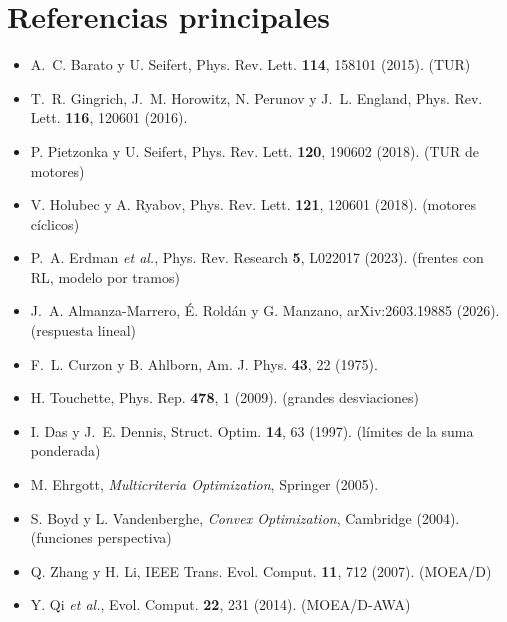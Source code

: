 \section*{Referencias principales}
\begin{itemize}\small
\item A.~C. Barato y U. Seifert, Phys. Rev. Lett. \textbf{114}, 158101 (2015). (TUR)
\item T.~R. Gingrich, J.~M. Horowitz, N. Perunov y J.~L. England, Phys. Rev. Lett. \textbf{116}, 120601 (2016).
\item P. Pietzonka y U. Seifert, Phys. Rev. Lett. \textbf{120}, 190602 (2018). (TUR de motores)
\item V. Holubec y A. Ryabov, Phys. Rev. Lett. \textbf{121}, 120601 (2018). (motores cíclicos)
\item P.~A. Erdman \emph{et al.}, Phys. Rev. Research \textbf{5}, L022017 (2023). (frentes con RL, modelo por tramos)
\item J.~A. Almanza-Marrero, É. Roldán y G. Manzano, arXiv:2603.19885 (2026). (respuesta lineal)
\item F.~L. Curzon y B. Ahlborn, Am. J. Phys. \textbf{43}, 22 (1975).
\item H. Touchette, Phys. Rep. \textbf{478}, 1 (2009). (grandes desviaciones)
\item I. Das y J.~E. Dennis, Struct. Optim. \textbf{14}, 63 (1997). (límites de la suma ponderada)
\item M. Ehrgott, \emph{Multicriteria Optimization}, Springer (2005).
\item S. Boyd y L. Vandenberghe, \emph{Convex Optimization}, Cambridge (2004). (funciones perspectiva)
\item Q. Zhang y H. Li, IEEE Trans. Evol. Comput. \textbf{11}, 712 (2007). (MOEA/D)
\item Y. Qi \emph{et al.}, Evol. Comput. \textbf{22}, 231 (2014). (MOEA/D-AWA)
\end{itemize}
